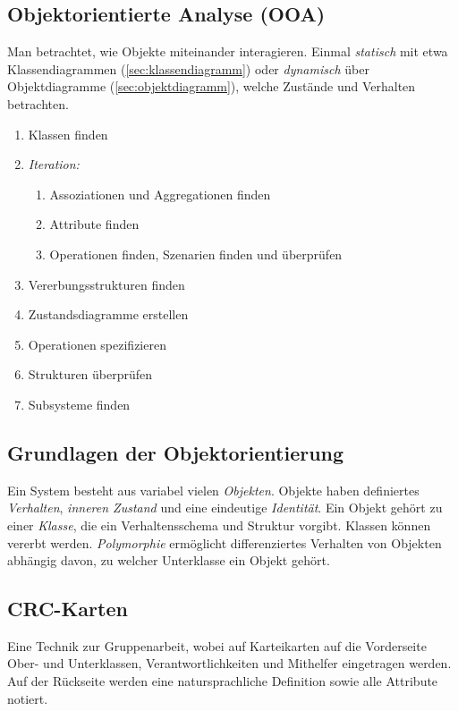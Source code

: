 \documentclass{panikzettel}
\begin{document}
\subsection{Objektorientierte Analyse (OOA)}

Man betrachtet, wie Objekte miteinander interagieren. Einmal \emph{statisch} mit etwa Klassendiagrammen (\ref{sec:klassendiagramm}) oder \emph{dynamisch} über Objektdiagramme (\ref{sec:objektdiagramm}), welche Zustände und Verhalten betrachten.

\begin{enumerate}
\item Klassen finden
\item \textit{Iteration:} \begin{enumerate}
\item Assoziationen und Aggregationen finden
\item Attribute finden
\item Operationen finden, Szenarien finden und überprüfen
\end{enumerate}
\item Vererbungsstrukturen finden
\item Zustandsdiagramme erstellen
\item Operationen spezifizieren
\item Strukturen überprüfen
\item Subsysteme finden
\end{enumerate}


\subsection{Grundlagen der Objektorientierung}

Ein System besteht aus variabel vielen \emph{Objekten}. Objekte haben definiertes \emph{Verhalten}, \emph{inneren Zustand} und eine eindeutige \emph{Identität}. Ein Objekt gehört zu einer \emph{Klasse}, die ein Verhaltensschema und Struktur vorgibt. Klassen können vererbt werden. \emph{Polymorphie} ermöglicht differenziertes Verhalten von Objekten abhängig davon, zu welcher Unterklasse ein Objekt gehört.

\subsection{CRC-Karten}

Eine Technik zur Gruppenarbeit, wobei auf Karteikarten auf die Vorderseite Ober- und Unterklassen, Verantwortlichkeiten und Mithelfer eingetragen werden.
Auf der Rückseite werden eine natursprachliche Definition sowie alle Attribute notiert.
\end{document}
